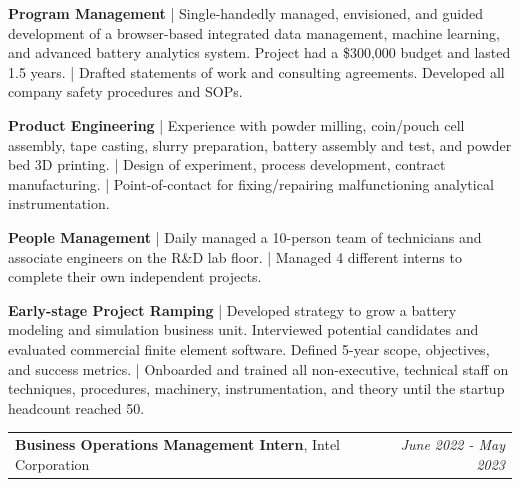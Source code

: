 \documentclass[letterpaper,10.8pt]{article}
\newcommand{\resumeItemListStart}{\begin{itemize}[leftmargin=*]}
\newcommand{\resumeItemListEnd}{\end{itemize}\vspace{-5pt}}
\begin{document}
\resumeItemListStart
{\vspace{-2pt}\item\small{\textbf{Program Management} | Single-handedly managed, envisioned, and guided development of a browser-based integrated data management, machine learning, and advanced battery analytics system. Project had a \$300,000 budget and lasted 1.5 years. | Drafted statements of work and consulting agreements. Developed all company safety procedures and SOPs. \vspace{-2pt}}}

{\vspace{-2pt}\item\small{\textbf{Product Engineering} | Experience with powder milling, coin/pouch cell assembly, tape casting, slurry preparation, battery assembly and test, and powder bed 3D printing. | Design of experiment, process development, contract manufacturing. | Point-of-contact for fixing/repairing malfunctioning analytical instrumentation. \vspace{-2pt}}} 

{\vspace{-2pt}\item\small{\textbf{People Management} | Daily managed a 10-person team of technicians and associate engineers on the R\&D lab floor. | Managed 4 different interns to complete their own independent projects. \vspace{-2pt}}} 

{\vspace{-2pt}\item\small{\textbf{Early-stage Project Ramping} | Developed strategy to grow a battery modeling and simulation business unit. Interviewed potential candidates and evaluated commercial finite element software. Defined 5-year scope, objectives, and success metrics. | Onboarded and trained all non-executive, technical staff on techniques, procedures, machinery, instrumentation, and theory until the startup headcount reached 50. \vspace{-2pt}}}
\resumeItemListEnd

{\vspace{-1pt}\item\begin{tabular*}{0.97\textwidth}{l@{\extracolsep{\fill}}r}
\textbf{Business Operations Management Intern}, 
{Intel Corporation} & 
\textit{\small June 2022 - May 2023} 
\end{tabular*}\vspace{-4pt}}
\end{document}
